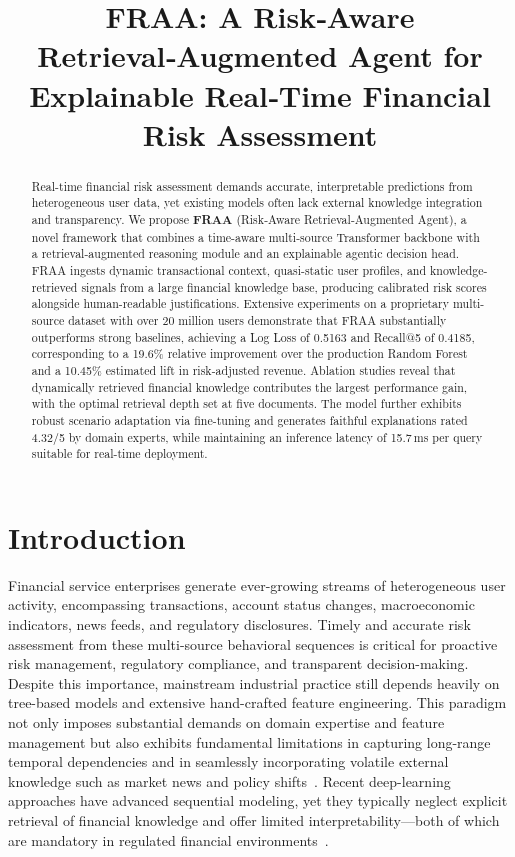\documentclass[10pt,twocolumn]{article}
\title{FRAA: A Risk‑Aware Retrieval‑Augmented Agent for Explainable Real‑Time Financial Risk Assessment}
\begin{document}
\maketitle
\begin{abstract}
Real-time financial risk assessment demands accurate, interpretable predictions from heterogeneous user data, yet existing models often lack external knowledge integration and transparency. 
We propose \textbf{FRAA} (Risk‑Aware Retrieval‑Augmented Agent), a novel framework that combines a time-aware multi-source Transformer backbone with a retrieval-augmented reasoning module and an explainable agentic decision head. 
FRAA ingests dynamic transactional context, quasi-static user profiles, and knowledge-retrieved signals from a large financial knowledge base, producing calibrated risk scores alongside human-readable justifications.
Extensive experiments on a proprietary multi-source dataset with over 20 million users demonstrate that FRAA substantially outperforms strong baselines, achieving a Log Loss of 0.5163 and Recall@5 of 0.4185, corresponding to a 19.6\% relative improvement over the production Random Forest and a 10.45\% estimated lift in risk-adjusted revenue.
Ablation studies reveal that dynamically retrieved financial knowledge contributes the largest performance gain, with the optimal retrieval depth set at five documents.
The model further exhibits robust scenario adaptation via fine-tuning and generates faithful explanations rated 4.32/5 by domain experts, while maintaining an inference latency of 15.7\,ms per query suitable for real-time deployment.
\end{abstract}

\section{Introduction}

Financial service enterprises generate ever-growing streams of heterogeneous user activity, encompassing transactions, account status changes, macroeconomic indicators, news feeds, and regulatory disclosures.
Timely and accurate risk assessment from these multi-source behavioral sequences is critical for proactive risk management, regulatory compliance, and transparent decision-making.
Despite this importance, mainstream industrial practice still depends heavily on tree-based models and extensive hand-crafted feature engineering.
This paradigm not only imposes substantial demands on domain expertise and feature management but also exhibits fundamental limitations in capturing long-range temporal dependencies and in seamlessly incorporating volatile external knowledge such as market news and policy shifts~\cite{arxiv-2512.05442,arxiv-2511.04919}.
Recent deep-learning approaches have advanced sequential modeling, yet they typically neglect explicit retrieval of financial knowledge and offer limited interpretability—both of which are mandatory in regulated financial environments~\cite{arxiv-2511.06282,arxiv-2511.05973,arxiv-2510.24136,arxiv-2510.21823}.
\end{document}
